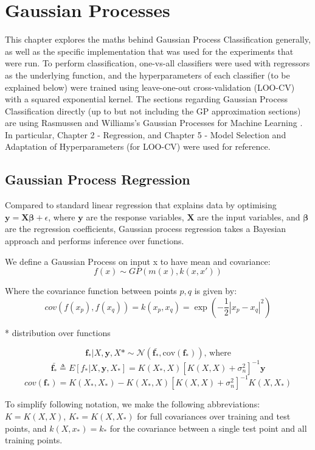 \chapter{Gaussian Processes} \label{chap:gps}

This chapter explores the maths behind Gaussian Process Classification generally, as well as the specific implementation that was used for the experiments that were run. To perform classification, one-vs-all classifiers were used with regressors as the underlying function, and the hyperparameters of each classifier (to be explained below) were trained using leave-one-out cross-validation (LOO-CV) with a squared exponential kernel. The sections regarding Gaussian Process Classification directly (up to but not including the GP approximation sections) are using Rasmussen and Williams's Gaussian Processes for Machine Learning \citep{rasmussen06}. In particular, Chapter 2 - Regression, and Chapter 5 - Model Selection and Adaptation of Hyperparameters (for LOO-CV) were used for reference.


\section{Gaussian Process Regression}

Compared to standard linear regression that explains data by optimising $\mathbf{y=X\beta} + \epsilon$, where $\mathbf{y}$ are the response variables, $\mathbf{X}$ are the input variables, and $\mathbf{\beta}$ are the regression coefficients, Gaussian process regression takes a Bayesian approach and performs inference over functions.

We define a Gaussian Process on input x to have mean and covariance:
$$f(x) \sim GP(m(x), k(x, x'))$$

Where the covariance function between points $p, q$ is given by:
$$cov(f(x_p), f(x_q)) = k(x_p, x_q) = \exp(-\frac{1}{2}|x_p-x_q|^2)$$

* distribution over functions

$$\mathbf{f_*} | X, \mathbf{y}, X* \sim \mathcal{N}(\mathbf{\bar{f_*}}, \text{cov}(\mathbf{f_*})) \text{, where}$$
$$\mathbf{\bar{f_*}} \triangleq E[f_*|X,\mathbf{y},X_*] = K(X_*, X)[K(X,X) + \sigma^2_n]^{-1}\mathbf{y}$$
$$cov(\mathbf{f_*}) = K(X_*,X_*) - K(X_*, X)[K(X,X) + \sigma_n^2]^{-1}K(X,X_*)$$

To simplify following notation, we make the following abbreviations:
$K = K(X, X)$, $K_* = K(X, X_*)$ for full covariances over training and test points, and $k(X, x_*) = k_*$ for the covariance between a single test point and all training points.

